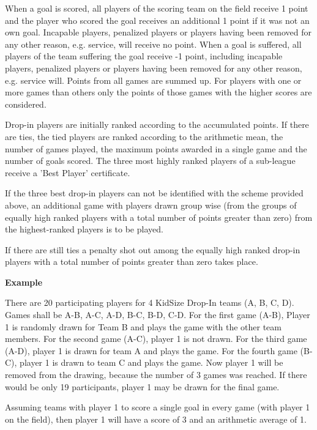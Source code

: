 When a goal is scored, all players of the scoring team on the field receive 1 point and the player who scored the goal receives an additional 1 point if it was not an own goal. Incapable players, penalized players or players having been removed for any other reason, e.g. service, will receive no point. When a goal is suffered, all players of the team suffering the goal receive -1 point, including incapable players, penalized players or players having been removed for any other reason, e.g. service will. Points from all games are summed up. For players with one or more games than others only the points of those games with the higher scores are considered.

Drop-in players are initially ranked according to the accumulated points. If there are ties, the tied players are ranked according to the arithmetic mean, the number of games played, the maximum points awarded in a single game and the number of goals scored. The three most highly ranked players of a sub-league receive a 'Best Player' certificate.

If the three best drop-in players can not be identified with the scheme provided above, an additional game with players drawn group wise (from the groups of equally high ranked players with a total number of points greater than zero) from the highest-ranked players is to be played.

If there are still ties a penalty shot out among the equally high ranked drop-in players with a total number of points greater than zero takes place.

\bigskip 
 
{\bfseries Example}
 
There are 20 participating players for 4 KidSize Drop-In teams (A, B, C, D). Games shall be A-B, A-C, A-D, B-C, B-D, C-D. For the first game (A-B), Player 1 is randomly drawn for Team B and plays the game with the other team members. For the second game (A-C), player 1 is not drawn. For the third game (A-D), player 1 is drawn for team A and plays the game. For the fourth game (B-C), player 1 is drawn to team C and plays the game. Now player 1 will be removed from the drawing, because the number of 3 games was reached. If there would be only 19 participants, player 1 may be drawn for the final game.

Assuming teams with player 1 to score a single goal in every game (with player 1 on the field), then player 1 will have a score of 3 and an arithmetic average of 1.

\bigskip

